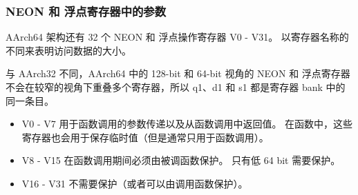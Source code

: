 \subsubsection{NEON 和 浮点寄存器中的参数}

AArch64 架构还有 32 个 NEON 和 浮点操作寄存器 V0 - V31。
以寄存器名称的不同来表明访问数据的大小。

\begin{Tcbox}[title={Note}]
  与 AArch32 不同，AArch64 中的 128-bit 和 64-bit 视角的 NEON 和 浮点寄存器不会在较窄的视角下重叠多个寄存器，所以 q1、d1 和 s1 都是寄存器 bank 中的同一条目。
\end{Tcbox}


\begin{itemize}
  \item V0 - V7 用于函数调用的参数传递以及从函数调用中返回值。
    在函数中，这些寄存器也会用于保存临时值（但是通常只用于函数调用）。
  \item V8 - V15 在函数调用期间必须由被调函数保护。
    只有低 64 bit 需要保护。
  \item V16 - V31 不需要保护（或者可以由调用函数保护）。
\end{itemize}
